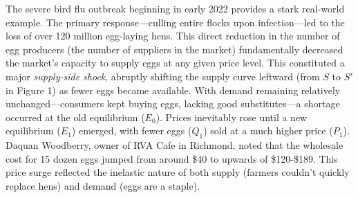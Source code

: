 \documentclass[12pt]{article}
\begin{document}
\begin{doublespace}
  The severe bird flu outbreak beginning in early 2022 provides a stark real-world example. The primary response—culling entire flocks upon infection—led to the loss of over 120 million egg-laying hens. This direct reduction in the number of egg producers (the number of suppliers in the market) fundamentally decreased the market's capacity to supply eggs at any given price level. This constituted a major \emph{supply-side shock}, abruptly shifting the supply curve leftward (from $S$ to $S'$ in Figure 1) as fewer eggs became available. With demand remaining relatively unchanged—consumers kept buying eggs, lacking good substitutes—a shortage occurred at the old equilibrium ($E_0$). Prices inevitably rose until a new equilibrium ($E_1$) emerged, with fewer eggs ($Q_1$) sold at a much higher price ($P_1$). Daquan Woodberry, owner of RVA Cafe in Richmond, noted that the wholesale cost for 15 dozen eggs jumped from around \$40 to upwards of \$120-\$189. This price surge reflected the inelastic nature of both supply (farmers couldn't quickly replace hens) and demand (eggs are a staple).
  \begin{figure}[H]
    \centering
\end{figure}
\end{doublespace}
\end{document}
